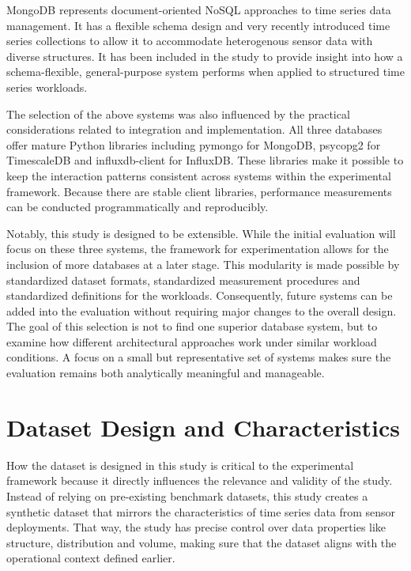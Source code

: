 MongoDB \cite{mongodb_github} represents document-oriented NoSQL approaches to time series data management. It has a flexible schema design and very recently introduced time series collections to allow it to accommodate heterogenous sensor data with diverse structures. It has been included in the study to provide insight into how a schema-flexible, general-purpose system performs when applied to structured time series workloads.


The selection of the above systems was also influenced by the practical considerations related to integration and implementation. All three databases offer mature Python libraries including pymongo for MongoDB, psycopg2 for TimescaleDB and influxdb-client for InfluxDB. These libraries make it possible to keep the interaction patterns consistent across systems within the experimental framework. Because there are stable client libraries, performance measurements can be conducted programmatically and reproducibly.

Notably, this study is designed to be extensible. While the initial evaluation will focus on these three systems, the framework for experimentation allows for the inclusion of more databases at a later stage. This modularity is made possible by standardized dataset formats, standardized measurement procedures and standardized definitions for the workloads. Consequently, future systems can be added into the evaluation without requiring major changes to the overall design. The goal of this selection is not to find one superior database system, but to examine how different architectural approaches work under similar workload conditions. A focus on a small but representative set of systems makes sure the evaluation remains both analytically meaningful and manageable. 


\section{Dataset Design and Characteristics}
How the dataset is designed in this study is critical to the experimental framework because it directly influences the relevance and validity of the study. Instead of relying on pre-existing benchmark datasets, this study creates a synthetic dataset that mirrors the characteristics of time series data from sensor deployments. That way, the study has precise control over data properties like structure, distribution and volume, making sure that the dataset aligns with the operational context defined earlier. 

